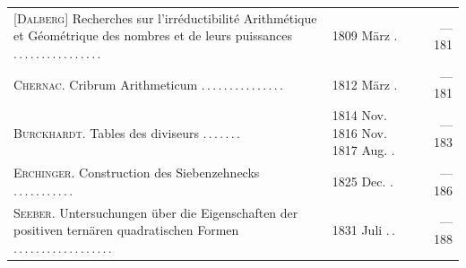 \begingroup\fontsize{10}{13}\selectfont
\begin{longtable}{@{}p{.60\linewidth}@{\quad}p{.24\linewidth}@{\quad}r@{}}
[\textsc{Dalberg}] Recherches sur l’irréductibilité Arithmétique et Géométrique des nombres et de leurs puissances .\,.\,.\,.\,.\,.\,.\,.\,.\,.\,.\,.\,.\,.\,.\,. & 1809 März . & — 181 \\[3pt]
\textsc{Chernac}. Cribrum Arithmeticum .\,.\,.\,.\,.\,.\,.\,.\,.\,.\,.\,.\,.\,.\,. & 1812 März . & — 181 \\[3pt]
\textsc{Burckhardt}. Tables des diviseurs .\,.\,.\,.\,.\,.\,. & 1814 Nov. 1816 Nov. 1817 Aug. . & — 183 \\[3pt]
\textsc{Erchinger}. Construction des Siebenzehnecks .\,.\,.\,.\,.\,.\,.\,.\,.\,.\,. & 1825 Dec. . & — 186 \\[3pt]
\textsc{Seeber}. Untersuchungen über die Eigenschaften der positiven ternären quadratischen Formen .\,.\,.\,.\,.\,.\,.\,.\,.\,.\,.\,.\,.\,.\,.\,.\,.\,. & 1831 Juli .\,. & — 188 \\[3pt]
\end{longtable}\endgroup
